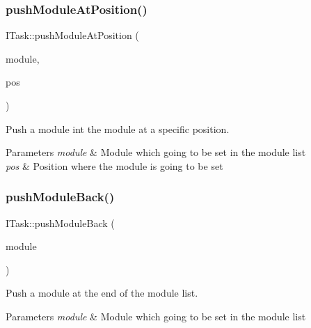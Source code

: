 \subsubsection{\texorpdfstring{push\+Module\+At\+Position()}{pushModuleAtPosition()}}
{\footnotesize\ttfamily I\+Task\+::push\+Module\+At\+Position (\begin{DoxyParamCaption}\item[{std\+::unique\+\_\+ptr$<$ \mbox{\hyperlink{classxzia_1_1AHTTPModule}{A\+H\+T\+T\+P\+Module}} $>$}]{module,  }\item[{size\+\_\+t}]{pos }\end{DoxyParamCaption})\hspace{0.3cm}{\ttfamily [pure virtual]}}



Push a module int the module at a specific position. 


\begin{DoxyParams}{Parameters}
{\em module} & Module which going to be set in the module list \\
\hline
{\em pos} & Position where the module is going to be set \\
\hline
\end{DoxyParams}
\mbox{\label{classxzia_1_1ITask_a4a742a320f905285dc8fa4510090c381}} 
\subsubsection{\texorpdfstring{push\+Module\+Back()}{pushModuleBack()}}
{\footnotesize\ttfamily I\+Task\+::push\+Module\+Back (\begin{DoxyParamCaption}\item[{std\+::unique\+\_\+ptr$<$ \mbox{\hyperlink{classxzia_1_1AHTTPModule}{A\+H\+T\+T\+P\+Module}} $>$}]{module }\end{DoxyParamCaption})\hspace{0.3cm}{\ttfamily [pure virtual]}}



Push a module at the end of the module list. 


\begin{DoxyParams}{Parameters}
{\em module} & Module which going to be set in the module list \\
\hline
\end{DoxyParams}
\mbox{\label{classxzia_1_1ITask_a0df4e8d2b1391fe1aa7e7bed7d35175e}} 
